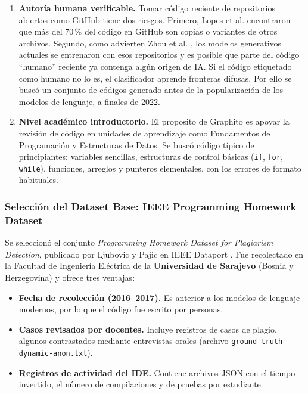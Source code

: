 \begin{enumerate}
    \item \textbf{Autoría humana verificable.}
    Tomar código reciente de repositorios abiertos como GitHub tiene dos riesgos. Primero, Lopes et al. \cite{Lopes2017DejaVu} encontraron que más del 70\,\% del código en GitHub son copias o variantes de otros archivos. Segundo, como advierten Zhou et al. \cite{Zhou2023Contamination}, los modelos generativos actuales se entrenaron con esos repositorios y es posible que parte del código ``humano'' reciente ya contenga algún origen de IA. Si el código etiquetado como humano no lo es, el clasificador aprende fronteras difusas. Por ello se buscó un conjunto de códigos generado antes de la popularización de los modelos de lenguaje, a finales de 2022.

    \item \textbf{Nivel académico introductorio.}
    El proposito de Graphito es apoyar la revisión de código en unidades de aprendizaje como Fundamentos de Programación y Estructuras de Datos. Se buscó código típico de principiantes: variables sencillas, estructuras de control básicas (\texttt{if}, \texttt{for}, \texttt{while}), funciones, arreglos y punteros elementales, con los errores de formato habituales.
\end{enumerate}

\subsubsection{Selección del Dataset Base: IEEE Programming Homework Dataset}
\label{subsec:seleccion_dataset_ieee}

Se seleccionó el conjunto \textit{Programming Homework Dataset for Plagiarism Detection}, publicado por Ljubovic y Pajic en IEEE Dataport \cite{Ljubovic2020}. Fue recolectado en la Facultad de Ingeniería Eléctrica de la \textbf{Universidad de Sarajevo} (Bosnia y Herzegovina) y ofrece tres ventajas:

\begin{itemize}
    \item \textbf{Fecha de recolección (2016--2017).} Es anterior a los modelos de lenguaje modernos, por lo que el código fue escrito por personas.

    \item \textbf{Casos revisados por docentes.} Incluye registros de casos de plagio, algunos contrastados mediante entrevistas orales (archivo \texttt{ground-truth-}\allowbreak\texttt{dynamic-}\allowbreak\texttt{anon.txt}).

    \item \textbf{Registros de actividad del IDE.} Contiene archivos JSON con el tiempo invertido, el número de compilaciones y de pruebas por estudiante.
\end{itemize}

